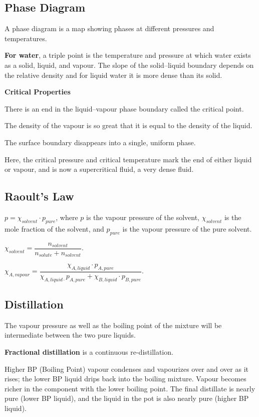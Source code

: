 \documentclass[a4paper,12pt]{article}
\begin{document}
\subsection{Phase Diagram}
A phase diagram is a map showing phases at different pressures and temperatures.\par
\textbf{For water}, a triple point is the temperature and pressure at which water exists as a solid, liquid, and vapour. The slope of the solid–liquid boundary depends on the relative density and for liquid water it is more dense than its solid.\par
\textbf{Critical Properties} \par
There is an end in the liquid–vapour phase boundary called the critical point. \par
The density of the vapour is so great that it is equal to the density of the liquid.\par
 The surface boundary disappears into a single, uniform phase.\par
Here, the critical pressure and critical temperature mark the end of either liquid or vapour, and is now a supercritical fluid, a very dense fluid.
\subsection{Raoult's Law}
$p=\chi_{solvent}\cdot p_{pure}$, where $p$ is the vapour pressure of the solvent, $\chi_{solvent}$ is the mole fraction of the solvent, and $p_{pure}$ is the vapour pressure of the pure solvent.\par
$\chi_{solvent} =\dfrac{n_{solvent}}{n_{solute} + n_{solvent}}$.\par
$\chi_{A,vapour} =\dfrac{\chi_{A,liquid}\cdot p_{A,pure}} {{\chi_{A,liquid\cdot} p_{A,pure} + \chi_{B,liquid}\cdot p_{B,pure}}}$.
\subsection{Distillation}
The vapour pressure as well as the boiling point of the mixture will be intermediate between the two pure liquids.\par
\textbf{Fractional distillation} is a continuous re-distillation. \par
Higher BP (Boiling Point) vapour condenses and vapourizes over and over as it rises; the lower BP liquid drips back into the boiling mixture.
Vapour becomes richer in the component with the lower boiling point. The final distillate is nearly pure (lower BP liquid), and the liquid in the pot is also nearly pure (higher BP liquid).
\end{document}
